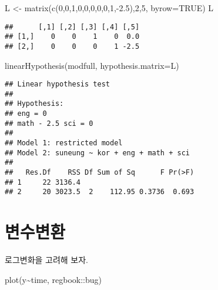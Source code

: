 \documentclass[
]{book}
\newenvironment{Shaded}{\begin{snugshade}}{\end{snugshade}}
\newcommand{\AttributeTok}[1]{\textcolor[rgb]{0.77,0.63,0.00}{#1}}
\newcommand{\ConstantTok}[1]{\textcolor[rgb]{0.00,0.00,0.00}{#1}}
\newcommand{\DecValTok}[1]{\textcolor[rgb]{0.00,0.00,0.81}{#1}}
\newcommand{\FloatTok}[1]{\textcolor[rgb]{0.00,0.00,0.81}{#1}}
\newcommand{\FunctionTok}[1]{\textcolor[rgb]{0.00,0.00,0.00}{#1}}
\newcommand{\NormalTok}[1]{#1}
\newcommand{\OtherTok}[1]{\textcolor[rgb]{0.56,0.35,0.01}{#1}}
\newcommand{\SpecialCharTok}[1]{\textcolor[rgb]{0.00,0.00,0.00}{#1}}
\begin{document}
\begin{Shaded}
\begin{Highlighting}[]
\NormalTok{L }\OtherTok{\textless{}{-}} \FunctionTok{matrix}\NormalTok{(}\FunctionTok{c}\NormalTok{(}\DecValTok{0}\NormalTok{,}\DecValTok{0}\NormalTok{,}\DecValTok{1}\NormalTok{,}\DecValTok{0}\NormalTok{,}\DecValTok{0}\NormalTok{,}\DecValTok{0}\NormalTok{,}\DecValTok{0}\NormalTok{,}\DecValTok{0}\NormalTok{,}\DecValTok{1}\NormalTok{,}\SpecialCharTok{{-}}\FloatTok{2.5}\NormalTok{),}\DecValTok{2}\NormalTok{,}\DecValTok{5}\NormalTok{, }\AttributeTok{byrow=}\ConstantTok{TRUE}\NormalTok{)}
\NormalTok{L}
\end{Highlighting}
\end{Shaded}

\begin{verbatim}
##      [,1] [,2] [,3] [,4] [,5]
## [1,]    0    0    1    0  0.0
## [2,]    0    0    0    1 -2.5
\end{verbatim}

\begin{Shaded}
\begin{Highlighting}[]
\FunctionTok{linearHypothesis}\NormalTok{(modfull, }\AttributeTok{hypothesis.matrix=}\NormalTok{L)}
\end{Highlighting}
\end{Shaded}

\begin{verbatim}
## Linear hypothesis test
## 
## Hypothesis:
## eng = 0
## math - 2.5 sci = 0
## 
## Model 1: restricted model
## Model 2: suneung ~ kor + eng + math + sci
## 
##   Res.Df    RSS Df Sum of Sq      F Pr(>F)
## 1     22 3136.4                           
## 2     20 3023.5  2    112.95 0.3736  0.693
\end{verbatim}

\hypertarget{uxbcc0uxc218uxbcc0uxd658}{%
\section{변수변환}\label{uxbcc0uxc218uxbcc0uxd658}}

로그변화을 고려해 보자.

\begin{Shaded}
\begin{Highlighting}[]
\FunctionTok{plot}\NormalTok{(y}\SpecialCharTok{\textasciitilde{}}\NormalTok{time, regbook}\SpecialCharTok{::}\NormalTok{bug)}
\end{Highlighting}
\end{Shaded}
\end{document}
